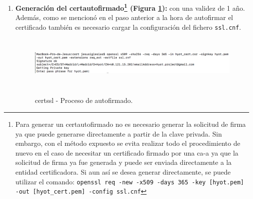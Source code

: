 \documentclass[12pt,a4paper, twoside]{report}
\begin{document}
\begin{enumerate}
\begin{lstlisting}[language=json, basicstyle=\ttfamily\footnotesize, numbers=none, escapechar=ß]
[ req_ext ]
subjectAltName 	            = @alt_names

[ alt_names ]
IP.1			    = [IP Server]

-----------------------------------------------------
ß\textbf{{\color{maroon} \# INFORMACIÓN ADICIONAL}}ß

ß\textbf{{\color{maroon} \# Si en lugar de una dirección IP, fuese un dominio}}ß
[ alt_names ]
DNS.1   		    = [Domain]

-----------------------------------------------------
ß\textbf{{\color{maroon} \# También, se pueden especificar varias alternativas}}ß
[ alt_names ]
DNS.1   		    = [Domain1]
DNS.2       		    = [Domain2]
IP.1			    = [IP Server]
\end{lstlisting}
		
		El fichero resultante de la solicitud de firma \texttt{hyot\_cert.csr} debería ser enviado a una \gls{ca-a} la cual verificaría la identidad del solicitante y expediría un certificado firmado. En este caso, como se va a utilizar un \gls{certautofirmado} no es necesario este proceso.
	
		\item \textbf{Generación del \gls{certautofirmado}\footnote{Para generar un \gls{certautofirmado} no es necesario generar la solicitud de firma ya que puede generarse directamente a partir de la clave privada. Sin embargo, con el método expuesto se evita realizar todo el procedimiento de nuevo en el caso de necesitar un certificado firmado por una \gls{ca-a} ya que la solicitud de firma ya fue generada y puede ser enviada directamente a la entidad certificadora. Si aun así se desea generar directamente, se puede utilizar el comando: \texttt{openssl req -new -x509 -days 365 -key [hyot.pem] -out [hyot\_cert.pem] -config ssl.cnf}} (Figura \ref{fig:cert_selfsigned}):} con una validez de 1 año. Además, como se mencionó en el paso anterior a la hora de autofirmar el certificado también es necesario cargar la configuración del fichero \texttt{ssl.cnf}.
	
			\begin{figure}[!ht]   
				\caption{\Gls{certssl} - Proceso de autofirmado.} 
				\begin{center} 
	 				\includegraphics[width=18cm,height=2.6cm]{Images/installationManual/cert/cert_selfsigned.png} \\
					\label{fig:cert_selfsigned} 
				\end{center}  
			\end{figure}
			
	\end{enumerate}
		
\end{document}

